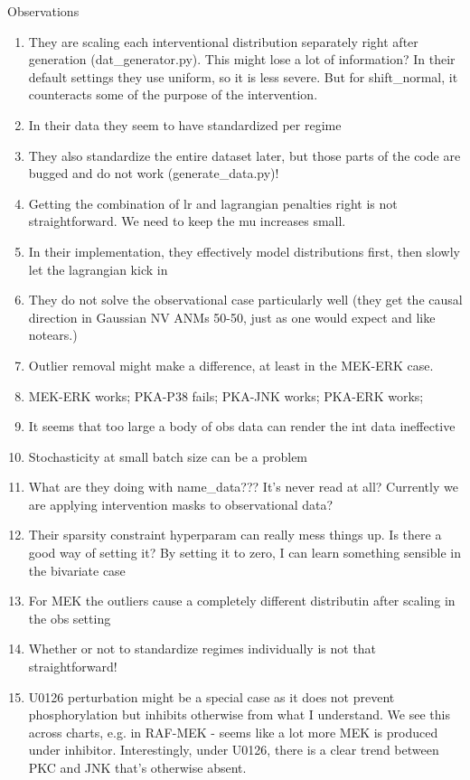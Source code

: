 \documentclass{article}
\begin{document}
\noindent
Observations
\begin{enumerate}
    \item They are scaling each interventional distribution separately right after generation (dat\_generator.py). This might lose a lot of information? In their default settings they use uniform, so it is less severe. But for shift\_normal, it counteracts some of the purpose of the intervention.
    \item In their data they seem to have standardized per regime
    \item They also standardize the entire dataset later, but those parts of the code are bugged and do not work (generate\_data.py)!
    \item Getting the combination of lr and lagrangian penalties right is not straightforward. We need to keep the mu increases small.
    \item In their implementation, they effectively model distributions first, then slowly let the lagrangian kick in
    \item They do not solve the observational case particularly well (they get the causal direction in Gaussian NV ANMs 50-50, just as one would expect and like notears.)
    \item Outlier removal might make a difference, at least in the MEK-ERK case.
    \item MEK-ERK works; PKA-P38 fails; PKA-JNK works; PKA-ERK works;
    \item It seems that too large a body of obs data can render the int data ineffective
    \item Stochasticity at small batch size can be a problem
    \item What are they doing with name\_data??? It's never read at all? Currently we are applying intervention masks to observational data?
    \item Their sparsity constraint hyperparam can really mess things up. Is there a good way of setting it? By setting it to zero, I can learn something sensible in the bivariate case
    \item For MEK the outliers cause a completely different distributin after scaling in the obs setting
    \item Whether or not to standardize regimes individually is not that straightforward!
    \item U0126 perturbation might be a special case as it does not prevent phosphorylation but inhibits otherwise from what I understand. We see this across charts, e.g. in RAF-MEK - seems like a lot more MEK is produced under inhibitor. Interestingly, under U0126, there is a clear trend between PKC and JNK that's otherwise absent.

\end{enumerate}
\end{document}
